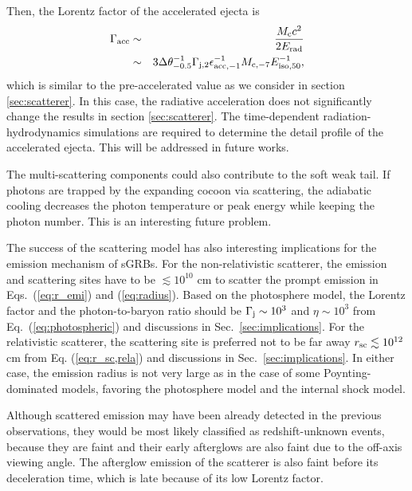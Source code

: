 \documentclass{emulateapj}
\begin{document}
Then, the Lorentz factor of the accelerated ejecta is 
\begin{eqnarray}
\Gamma_{\rm acc}&\sim&\frac{M_{\rm c}c^2}{2E_{\rm rad}} \nonumber \\
&\sim&3\Delta\theta_{-0.5}^{-1}\Gamma_{\rm j,2}\epsilon_{\rm acc,-1}^{-1}M_{\rm c,-7}E_{\rm iso,50}^{-1},
\end{eqnarray}
which is similar to the pre-accelerated value as we consider in section \ref{sec:scatterer}.
In this case, the radiative acceleration does not significantly change the results in section \ref{sec:scatterer}.
The time-dependent radiation-hydrodynamics simulations are required to determine
the detail profile of the accelerated ejecta.
This will be addressed in future works.

The multi-scattering components could also contribute to the soft weak tail.
If photons are trapped by the expanding cocoon via scattering, 
the adiabatic cooling decreases the photon temperature or peak energy 
while keeping the photon number.
This is an interesting future problem. 

The success of the scattering model has also
interesting implications for the emission mechanism of sGRBs.
For the non-relativistic scatterer, 
the emission and scattering sites have to be $\lesssim10^{10}$ cm to scatter the prompt emission 
in Eqs.~(\ref{eq:r_emi}) and (\ref{eq:radius}).
Based on the photosphere model, the Lorentz factor and the photon-to-baryon ratio should be 
$\Gamma_{\rm j}\sim 10^3$ and $\eta\sim 10^3$ from Eq.~(\ref{eq:photospheric})
and discussions in Sec.~\ref{sec:implications}.
For the relativistic scatterer, the scattering site is preferred not to be far away
$r_{\rm sc}\lesssim10^{12}$ cm
from Eq. (\ref{eq:r_sc,rela}) and discussions in Sec.~\ref{sec:implications}.
In either case, the emission radius is not very large
as in the case of some Poynting-dominated models,
favoring the photosphere model and the internal shock model.

Although scattered emission may have been already detected in the previous observations,
they would be most likely classified as redshift-unknown events,
because they are faint and
their early afterglows are also faint due to the off-axis viewing angle.
The afterglow emission of the scatterer 
is also faint before its deceleration time,
which is late because of its low Lorentz factor.
\end{document}
